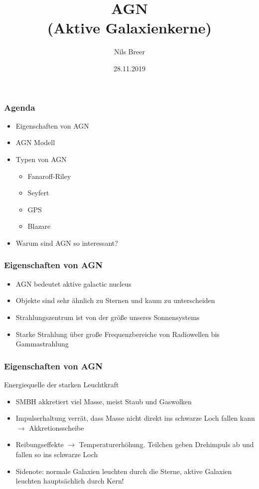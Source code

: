 \documentclass[aspectratio=1610, 9pt]{beamer}
\title{AGN \\(Aktive Galaxienkerne)}
\author[N.Breer]{Nils Breer}
\institute{Fakultät Physik}
\date{28.11.2019}
\begin{document}
\maketitle

\begin{frame}\frametitle{Agenda}
  \begin{itemize}
    \item Eigenschaften von AGN
    \item AGN Modell
    \item Typen von AGN 
    \begin{itemize}
      \item Fanaroff-Riley
      \item Seyfert
      \item GPS
      \item Blazare
    \end{itemize}
    \item Warum sind AGN so interessant?
  \end{itemize}
\end{frame}

\begin{frame}\frametitle{Eigenschaften von AGN}
  \begin{itemize}
    \item AGN bedeutet aktive galactic nucleus
    \item Objekte sind sehr \"ahnlich zu Sternen und kaum zu unterscheiden
    \item Strahlungszentrum ist von der gr\"o\ss e unseres Sonnensystems
    \item Starke Strahlung \"uber gro\ss e Frequenzbereiche von Radiowellen bis Gammastrahlung
  \end{itemize}
\end{frame}

\begin{frame}\frametitle{Eigenschaften von AGN}
  \begin{block}{Energiequelle der starken Leuchtkraft}
    \begin{itemize}
    \item SMBH akkretiert viel Masse, meist Staub und Gaswolken
    \item Impulserhaltung verr\"at, dass Masse nicht direkt ins schwarze Loch fallen kann $\to$ Akkretionsscheibe
    \item Reibungseffekte $\to$ Temperaturerh\"ohung. Teilchen geben Drehimpuls ab und fallen so ins schwarze Loch
    \item Sidenote: normale Galaxien leuchten durch die Sterne, aktive Galaxien leuchten haupts\"achlich durch Kern!
  \end{itemize}
  \end{block}
\end{frame}
\end{document}
